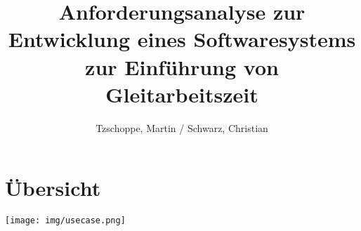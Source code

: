 \documentclass{article}
\title{Anforderungsanalyse zur Entwicklung eines Softwaresystems zur Einführung
von Gleitarbeitszeit}
\author{Tzschoppe, Martin / Schwarz, Christian}
\begin{document}
\maketitle
\newpage
\tableofcontents
\newpage

\section{Übersicht}
\begin{turn}{-90}

\texttt{[image: img/usecase.png]}

\end{turn}
\end{document}
